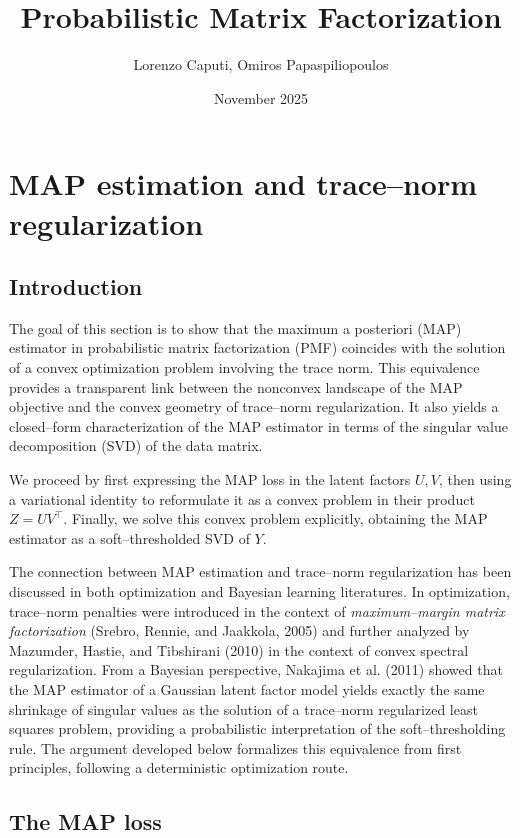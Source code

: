 \documentclass[11pt]{article}
\title{Probabilistic Matrix Factorization}
\date{November 2025}
\author{Lorenzo Caputi, Omiros Papaspiliopoulos}
\theoremstyle{spaced}
\begin{document}
\maketitle


\section{MAP estimation and trace--norm regularization}

\subsection*{Introduction}

The goal of this section is to show that the maximum a posteriori (MAP) estimator in probabilistic matrix factorization (PMF) coincides with the solution of a convex optimization problem involving the trace norm.  
This equivalence provides a transparent link between the nonconvex landscape of the MAP objective and the convex geometry of trace--norm regularization.  
It also yields a closed--form characterization of the MAP estimator in terms of the singular value decomposition (SVD) of the data matrix.

We proceed by first expressing the MAP loss in the latent factors \(U,V\), then using a variational identity to reformulate it as a convex problem in their product \(Z = UV^\top\).  
Finally, we solve this convex problem explicitly, obtaining the MAP estimator as a soft--thresholded SVD of \(Y\).

The connection between MAP estimation and trace--norm regularization has been discussed in both optimization and Bayesian learning literatures.
In optimization, trace--norm penalties were introduced in the context of \emph{maximum--margin matrix factorization} (Srebro, Rennie, and Jaakkola, 2005) and further analyzed by Mazumder, Hastie, and Tibshirani (2010) in the context of convex spectral regularization.
From a Bayesian perspective, Nakajima et al. (2011) showed that the MAP estimator of a Gaussian latent factor model yields exactly the same shrinkage of singular values as the solution of a trace--norm regularized least squares problem, providing a probabilistic interpretation of the soft--thresholding rule.
The argument developed below formalizes this equivalence from first principles, following a deterministic optimization route.

\subsection*{The MAP loss}
\end{document}
